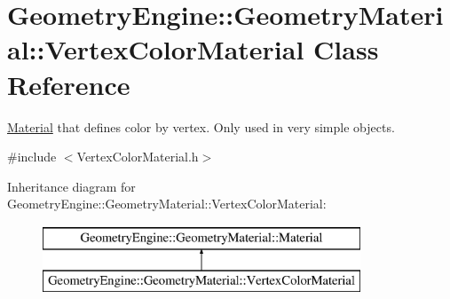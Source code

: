 \hypertarget{class_geometry_engine_1_1_geometry_material_1_1_vertex_color_material}{}\section{Geometry\+Engine\+::Geometry\+Material\+::Vertex\+Color\+Material Class Reference}
\label{class_geometry_engine_1_1_geometry_material_1_1_vertex_color_material}


\mbox{\hyperlink{class_geometry_engine_1_1_geometry_material_1_1_material}{Material}} that defines color by vertex. Only used in very simple objects.  




{\ttfamily \#include $<$Vertex\+Color\+Material.\+h$>$}

Inheritance diagram for Geometry\+Engine\+::Geometry\+Material\+::Vertex\+Color\+Material\+:\begin{figure}[H]
\begin{center}
\leavevmode
\includegraphics[height=2.000000cm]{class_geometry_engine_1_1_geometry_material_1_1_vertex_color_material}
\end{center}
\end{figure}
